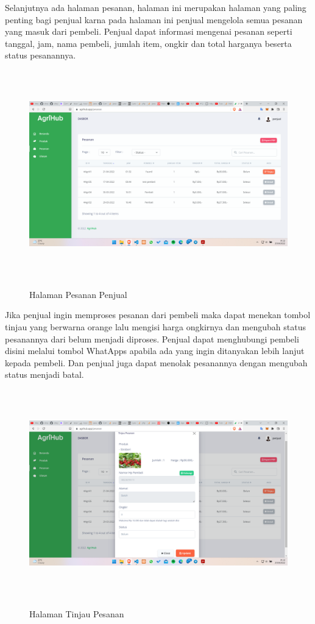 \begin{enumerate}
\begin{enumerate}
			\par Selanjutnya ada halaman pesanan, halaman ini merupakan halaman yang paling penting bagi penjual karna pada halaman ini penjual mengelola semua pesanan yang masuk dari pembeli. Penjual dapat informasi mengenai pesanan seperti tanggal, jam, nama pembeli, jumlah item, ongkir dan total harganya beserta status pesanannya.

			\begin{figure}[H]
				\centering
				{\includegraphics [width = 14.3cm, height= 9cm]{gambar/penjual/pesanan_penjual}}
				\caption{Halaman Pesanan Penjual}
				\label{pesanan_penjual}
			\end{figure}

			\par Jika penjual ingin memproses pesanan dari pembeli maka dapat menekan tombol tinjau yang berwarna orange lalu mengisi harga ongkirnya dan mengubah status pesanannya dari belum menjadi diproses. Penjual dapat menghubungi pembeli disini melalui tombol WhatApps apabila ada yang ingin ditanyakan lebih lanjut kepada pembeli. Dan penjual juga dapat menolak pesanannya dengan mengubah status menjadi batal.

			\begin{figure}[H]
				\centering
				{\includegraphics [width = 14.3cm, height= 9cm]{gambar/penjual/tinjau_pesanan}}
				\caption{Halaman Tinjau Pesanan}
				\label{tinjau_pesanan}
			\end{figure}


\end{enumerate}
\end{enumerate}
